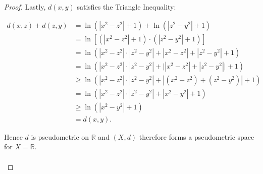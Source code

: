 \begin{proof}
        \pagebreak
        Lastly, $d(x, y)$ satisfies the Triangle Inequality:

        \begin{align*}
            d(x, z) + d(z, y) &= \ln{\left(|x^2 - z^2| + 1\right)}
                                 + \ln{\left(|z^2 - y^2| + 1\right)} \\
                              &= \ln{\left[
                                   \left(|x^2 - z^2| + 1\right)
                                   \cdot
                                   \left(|z^2 - y^2| + 1\right)
                                 \right]} \\
                              &= \ln{\left( 
                                   |x^2 - z^2| \cdot |z^2 - y^2|
                                 + |x^2 - z^2|
                                 + |z^2 - y^2|
                                 + 1
                                 \right)} \\
                              &= \ln{\left(
                                   |x^2 - z^2| \cdot |z^2 - y^2|
                                   + \Big| |x^2 - z^2| + |z^2 - y^2| \Big|
                                   + 1
                                 \right)} \\
                              &\ge \ln{\left(
                                   |x^2 - z^2| \cdot |z^2 - y^2|
                                   + |(x^2 - z^2) + (z^2 - y^2)|
                                   + 1
                                 \right)} \\
                              &= \ln{\left(
                                   |x^2 - z^2| \cdot |z^2 - y^2|
                                   + |x^2  - y^2|
                                   + 1
                                 \right)} \\
                              &\ge \ln{\left(
                                   |x^2  - y^2| + 1
                                 \right)} \\
                              &= d(x, y).
        \end{align*}

        Hence $d$ is pseudometric on $\mathbb{R}$ and $(X, d)$
        therefore forms a pseudometric space for $X = \mathbb{R}$.
        \\\\    

    \end{proof}